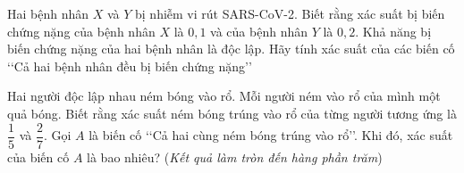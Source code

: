 \begin{bt}%

	Hai bệnh nhân $X$ và $Y$ bị nhiễm vi rút SARS-CoV-2. Biết rằng xác suất bị biến chứng nặng của bệnh nhân $X$ là $0{,}1$ và của bệnh nhân $Y$ là $0{,}2$. Khả năng bị biến chứng nặng của hai bệnh nhân là độc lập. Hãy tính xác suất của các biến cố \lq\lq Cả hai bệnh nhân đều bị biến chứng nặng\rq\rq
\end{bt}

\begin{bt}%

	Hai người độc lập nhau ném bóng vào rổ. Mỗi người ném vào rổ của mình một quả bóng. Biết rằng xác suất ném bóng trúng vào rổ của từng người tương ứng là $\dfrac{1}{5}$ và $\dfrac{2}{7}$. Gọi $A$ là biến cố \lq\lq Cả hai cùng ném bóng trúng vào rổ\rq\rq. Khi đó, xác suất của biến cố $A$ là bao nhiêu? (\textit{Kết quả làm tròn đến hàng phần trăm})
\end{bt}


